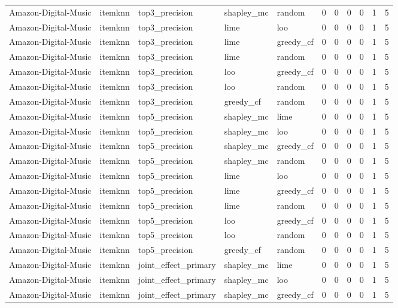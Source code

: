 \begin{table}[t]
{\begin{tabular}{lllllrrrrrr}
Amazon-Digital-Music & itemknn & top3\_precision & shapley\_mc & random & 0 & 0 & 0 & 0 & 1 & 5 \\
Amazon-Digital-Music & itemknn & top3\_precision & lime & loo & 0 & 0 & 0 & 0 & 1 & 5 \\
Amazon-Digital-Music & itemknn & top3\_precision & lime & greedy\_cf & 0 & 0 & 0 & 0 & 1 & 5 \\
Amazon-Digital-Music & itemknn & top3\_precision & lime & random & 0 & 0 & 0 & 0 & 1 & 5 \\
Amazon-Digital-Music & itemknn & top3\_precision & loo & greedy\_cf & 0 & 0 & 0 & 0 & 1 & 5 \\
Amazon-Digital-Music & itemknn & top3\_precision & loo & random & 0 & 0 & 0 & 0 & 1 & 5 \\
Amazon-Digital-Music & itemknn & top3\_precision & greedy\_cf & random & 0 & 0 & 0 & 0 & 1 & 5 \\
Amazon-Digital-Music & itemknn & top5\_precision & shapley\_mc & lime & 0 & 0 & 0 & 0 & 1 & 5 \\
Amazon-Digital-Music & itemknn & top5\_precision & shapley\_mc & loo & 0 & 0 & 0 & 0 & 1 & 5 \\
Amazon-Digital-Music & itemknn & top5\_precision & shapley\_mc & greedy\_cf & 0 & 0 & 0 & 0 & 1 & 5 \\
Amazon-Digital-Music & itemknn & top5\_precision & shapley\_mc & random & 0 & 0 & 0 & 0 & 1 & 5 \\
Amazon-Digital-Music & itemknn & top5\_precision & lime & loo & 0 & 0 & 0 & 0 & 1 & 5 \\
Amazon-Digital-Music & itemknn & top5\_precision & lime & greedy\_cf & 0 & 0 & 0 & 0 & 1 & 5 \\
Amazon-Digital-Music & itemknn & top5\_precision & lime & random & 0 & 0 & 0 & 0 & 1 & 5 \\
Amazon-Digital-Music & itemknn & top5\_precision & loo & greedy\_cf & 0 & 0 & 0 & 0 & 1 & 5 \\
Amazon-Digital-Music & itemknn & top5\_precision & loo & random & 0 & 0 & 0 & 0 & 1 & 5 \\
Amazon-Digital-Music & itemknn & top5\_precision & greedy\_cf & random & 0 & 0 & 0 & 0 & 1 & 5 \\
Amazon-Digital-Music & itemknn & joint\_effect\_primary & shapley\_mc & lime & 0 & 0 & 0 & 0 & 1 & 5 \\
Amazon-Digital-Music & itemknn & joint\_effect\_primary & shapley\_mc & loo & 0 & 0 & 0 & 0 & 1 & 5 \\
Amazon-Digital-Music & itemknn & joint\_effect\_primary & shapley\_mc & greedy\_cf & 0 & 0 & 0 & 0 & 1 & 5 \\

\end{tabular}}
\end{table}
